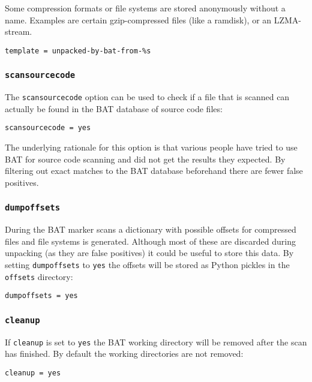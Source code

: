 \documentclass[10pt,a4paper]{article}
\begin{document}
Some compression formats or file systems are stored anonymously without a name.
Examples are certain gzip-compressed files (like a ramdisk), or an LZMA-stream.

\begin{verbatim}
template = unpacked-by-bat-from-%s
\end{verbatim}

\subsubsection{\texttt{scansourcecode}}

The \texttt{scansourcecode} option can be used to check if a file that is
scanned can actually be found in the BAT database of source code files:

\begin{verbatim}
scansourcecode = yes
\end{verbatim}

The underlying rationale for this option is that various people have tried to
use BAT for source code scanning and did not get the results they expected. By
filtering out exact matches to the BAT database beforehand there are fewer
false positives.

\subsubsection{\texttt{dumpoffsets}}

During the BAT marker scans a dictionary with possible offsets for compressed
files and file systems is generated. Although most of these are discarded
during unpacking (as they are false positives) it could be useful to store this
data. By setting \texttt{dumpoffsets} to \texttt{yes} the offsets will be
stored as Python pickles in the \texttt{offsets} directory:

\begin{verbatim}
dumpoffsets = yes
\end{verbatim}

\subsubsection{\texttt{cleanup}}

If \texttt{cleanup} is set to \texttt{yes} the BAT working directory will be
removed after the scan has finished. By default the working directories are not
removed:

\begin{verbatim}
cleanup = yes
\end{verbatim}
\end{document}
